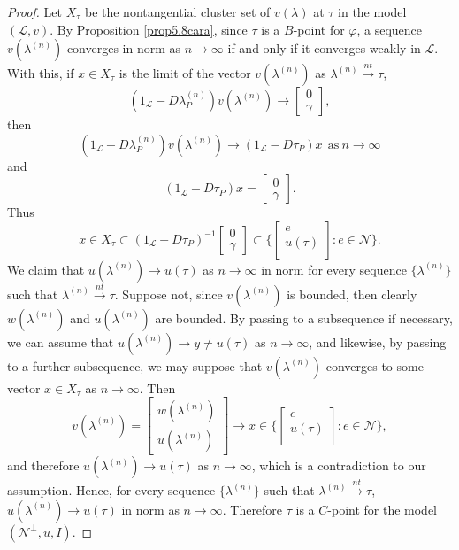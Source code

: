 \documentclass[11pt, reqno]{amsart}
\newcommand\1{\boldsymbol {1}}
\numberwithin{equation}{section}
\begin{document}
\begin{proof}
Let $X_{\tau}$ be the nontangential cluster set of $v(\lambda)$ at $\tau$ in the model $(\mathcal{L},v)$. By Proposition \ref{prop5.8cara}, since $\tau$ is a $B$-point for 
$\varphi$, a sequence $v(\lambda^{(n)})$ converges in norm as $n\rightarrow \infty$ if and only if it converges weakly in $\mathcal{L}$. With this, if $x\in X_{\tau}$ is the limit of the vector $v(\lambda^{(n)})$ as $\lambda^{(n)} {\overset{nt}\rightarrow}\tau$,  
$$(1_{\mathcal{L}}-D\lambda_{P}^{(n)})v(\lambda^{(n)})\rightarrow \begin{bmatrix}
    0 \\
    \gamma
\end{bmatrix},$$
then
$$ (1_{\mathcal{L}}-D\lambda_{P}^{(n)})v(\lambda^{(n)})\rightarrow (1_{\mathcal{L}}-D\tau_{P})x~~\text{as}~n\rightarrow \infty$$
and 
$$(1_{\mathcal{L}}-D\tau_{P})x
    =\begin{bmatrix}
    0 \\
    \gamma
\end{bmatrix}.$$
Thus 
$$x\in X_{\tau}\subset(1_{\mathcal{L}}-D\tau_{P})^{-1}\begin{bmatrix}
    0 \\
    \gamma
\end{bmatrix}\subset \bigg\{\begin{bmatrix}
    e \\
    u(\tau) \\
\end{bmatrix} : e\in\mathcal{N}\bigg\}.$$
We claim that $u(\lambda^{(n)})\rightarrow u(\tau)$ as $n\rightarrow \infty$ in norm for every sequence $\{\lambda^{(n)}\}$ such that $\lambda^{(n)} {\overset{nt}\rightarrow} \tau$. Suppose not, since $v(\lambda^{(n)})$ is bounded, then clearly $w(\lambda^{(n)})$ and $u(\lambda^{(n)})$ are bounded. By passing to a subsequence if necessary, we can assume that $u(\lambda^{(n)})\rightarrow y\neq u(\tau)$ as $n\rightarrow \infty$, and likewise, by passing to a further subsequence, we may suppose that $v(\lambda^{(n)})$ converges to some vector $ x\in X_{\tau}$ as $n\rightarrow \infty$. Then
$$v(\lambda^{(n)})=\begin{bmatrix}
    w(\lambda^{(n)}) \\
    u(\lambda^{(n)})
\end{bmatrix}\rightarrow x\in\bigg\{\begin{bmatrix}
    e \\
    u(\tau) \\
\end{bmatrix} : e\in\mathcal{N}\bigg\},$$
and therefore $u(\lambda^{(n)})\rightarrow u(\tau)$ as $n\rightarrow \infty$, which is a contradiction to our assumption. Hence, for every sequence $\{\lambda^{(n)}\}$ such that
 $\lambda^{(n)} {\overset{nt}\rightarrow} \tau$, $u(\lambda^{(n)})\rightarrow u(\tau)$ in norm as $n\rightarrow \infty$. Therefore $\tau$ is a $C$-point for the model $(\mathcal{N}^{\perp},u,I)$.


\end{proof}
\end{document}
